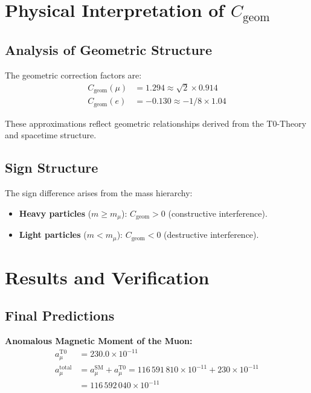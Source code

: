 \documentclass[12pt,a4paper]{article}
\newcommand{\Cgeom}{C_{\text{geom}}}
\newcommand{\mmu}{m_{\mu}}
\begin{document}
	\section{Physical Interpretation of \(\Cgeom\)}
	
	\subsection{Analysis of Geometric Structure}
	
	The geometric correction factors are:
	\begin{align}
		\Cgeom(\mu) &= 1.294 \approx \sqrt{2} \times 0.914 \\
		\Cgeom(e) &= -0.130 \approx -1/8 \times 1.04
	\end{align}
	
	These approximations reflect geometric relationships derived from the T0-Theory and spacetime structure.
	
	\subsection{Sign Structure}
	
	The sign difference arises from the mass hierarchy:
	\begin{itemize}
		\item \textbf{Heavy particles} (\( m \geq \mmu \)): \(\Cgeom > 0\) (constructive interference).
		\item \textbf{Light particles} (\( m < \mmu \)): \(\Cgeom < 0\) (destructive interference).
	\end{itemize}
	
	\section{Results and Verification}
	
	\subsection{Final Predictions}
	
	\textbf{Anomalous Magnetic Moment of the Muon:}
	\begin{align}
		a_\mu^{\text{T0}} &= 230.0 \times 10^{-11} \\
		a_\mu^{\text{total}} &= a_\mu^{\text{SM}} + a_\mu^{\text{T0}} = 116\,591\,810 \times 10^{-11} + 230 \times 10^{-11} \\
		&= 116\,592\,040 \times 10^{-11}
	\end{align}
	
\end{document}
